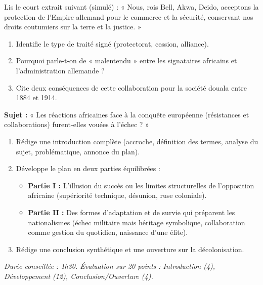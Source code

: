 \documentclass[11pt]{article}
\newcounter{popsec}
\newcounter{popsub}
\newcommand{\courssub}[1]{%
  \stepcounter{popsub}%
  \par\vspace{9pt}\noindent{\popxbold\fontsize{11.5}{13}\selectfont\color{popink}{\color{poporange}\thepopsec.\thepopsub}\hspace{6pt}#1}\par\nopagebreak\vspace{4pt}
}
\begin{document}
\begin{exercice}
Lis le court extrait suivant (simulé) : « Nous, rois Bell, Akwa, Deido, acceptons la protection de l'Empire allemand pour le commerce et la sécurité, conservant nos droits coutumiers sur la terre et la justice. »
\begin{enumerate}
    \item Identifie le type de traité signé (protectorat, cession, alliance).
    \item Pourquoi parle-t-on de « malentendu » entre les signataires africains et l'administration allemande ?
    \item Cite deux conséquences de cette collaboration pour la société douala entre 1884 et 1914.
\end{enumerate}
\end{exercice}

\courssub{Je me prépare au Bac}

\begin{exercice}
\textbf{Sujet :} « Les réactions africaines face à la conquête européenne (résistances et collaborations) furent-elles vouées à l'échec ? »
\begin{enumerate}
    \item Rédige une introduction complète (accroche, définition des termes, analyse du sujet, problématique, annonce du plan).
    \item Développe le plan en deux parties équilibrées :
    \begin{itemize}
        \item \textbf{Partie I :} L'illusion du succès ou les limites structurelles de l'opposition africaine (supériorité technique, désunion, ruse coloniale).
        \item \textbf{Partie II :} Des formes d'adaptation et de survie qui préparent les nationalismes (échec militaire mais héritage symbolique, collaboration comme gestion du quotidien, naissance d'une élite).
    \end{itemize}
    \item Rédige une conclusion synthétique et une ouverture sur la décolonisation.
\end{enumerate}
\textit{Durée conseillée : 1h30. Évaluation sur 20 points : Introduction (4), Développement (12), Conclusion/Ouverture (4).}
\end{exercice}
\end{document}
